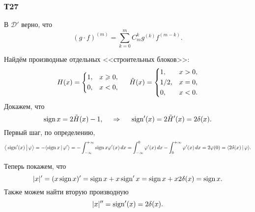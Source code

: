 \subsubsection*{Т27}

\begin{to_lem}
    В $\mathcal D'$ верно, что
    \begin{equation*}
        (g \cdot f)^{(m)} = \sum_{k=0}^{m} C_m^k g^{(k)} f^{(m-k)}.
    \end{equation*}
\end{to_lem}

Найдём производные отдельных <<строительных блоков>>:
\begin{equation*}
    H(x) = \left\{\begin{aligned}
        &1, &x\geq 0, \\
        &0, &x<0,
    \end{aligned}\right.
    \hspace{5 mm}
    \tilde{H} (x) = \left\{\begin{aligned}
        &1,   &x>0, \\
        &1/2, &x=0, \\
        &0,   &x<0. \\
    \end{aligned}\right. 
\end{equation*}
Докажем, что
\begin{equation*}
    \sign x = 2 \tilde{H}(x) - 1,
    \hspace{0.5cm} \Rightarrow \hspace{0.5cm}
    \sign'(x) = 2 \tilde{H}'(x) = 2 \delta(x).
\end{equation*}
Первый шаг, по определению,
\begin{align*}
    \big\langle \sign'(x) \,\big|\, \varphi  \big\rangle  = -\langle \sign x \,|\, \varphi' \rangle = - \int_{-\infty}^{+\infty} \sign x \varphi'(x) \d x =   
    \int_{-\infty}^{0} \varphi'(x) \d x - \int_{0}^{+\infty} \varphi'(x) \d x = 2 \varphi(0) = 
    \langle 2 \delta(x) \,|\, \varphi \rangle.
\end{align*}


Теперь покажем, что
\begin{equation*}
    |x|' = (x \sign x)' = \sign x + x \sign' x = \sign x + x 2 \delta(x) = \sign x.
\end{equation*}
Также можем найти вторую производную
\begin{equation*}
    |x|'' = \sign'(x) = 2 \delta(x). 
\end{equation*}



